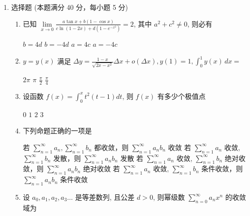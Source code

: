 
\begin{enumerate}
	\item
	选择题 (本题满分 40 分，每小题 5 分)
	
\begin{enumerate}
\item
已知 $\lim\limits _{x \rightarrow 0} \frac{a \tan x+b(1-\cos x)}{c \ln (1-2 x)+d\left(1-e^{-x^{2}}\right)}=2$, 其中 $a^{2}+c^{2}\neq 0$, 则必有 

	
\fourchoices
{$b=4 d$}
{$b=-4 d$}
{$a=4 c$}
{$a=-4 c$}

\item 
$y=y(x)$ 满足 $\Delta y=\frac{1-x}{\sqrt{2 x-x^{2}}} \Delta x+o(\Delta x), y(1)=1, \int_{0}^{1} y(x)\,dx=$  


\fourchoices
{$2 \pi$}
{$\pi$}
{$\frac{\pi}{2}$}
{$\frac{\pi}{4}$}

\item 
设函数 $f(x)=\int_{0}^{x} t^{2}(t-1) d t$, 则 $f(x)$ 有多少个极值点  


\fourchoices
{$ 0 $}
{$ 1 $}
{$ 2 $}
{$ 3 $}


\item 
下列命题正确的一项是  


\fourchoices
{若 $\sum\limits_{n=1}^{\infty} a_{n}, \sum\limits_{n=1}^{\infty} b_{n}$ 都收敛，则 $\sum\limits_{n=1}^{\infty} a_{n} b_{n}$ 收敛}
{若 $\sum\limits_{n=1}^{\infty} a_{n}$ 收敛, $\sum\limits_{n=1}^{\infty} b_{n}$ 发散，则 $\sum\limits_{n=1}^{\infty} a_{n} b_{n}$ 发散}
{若 $\sum\limits_{n=1}^{\infty} a_{n}$ 收敛, $\sum\limits_{n=1}^{\infty} b_{n}$ 绝对收敛，则 $\sum\limits_{n=1}^{\infty} a_{n} b_{n}$ 绝对收敛}
{若 $\sum\limits_{n=1}^{\infty} a_{n}$ 收敛, $\sum\limits_{n=1}^{\infty} b_{n}$ 条件收敛，则 $\sum\limits_{n=1}^{\infty} a_{n} b_{n}$ 条件收敛}


\item
设 $a_{0}, a_{1}, a_{2},a_{3} \ldots$ 是等差数列, 且公差 $d>0$, 则幂级数 $\sum\limits_{n=0}^{\infty} a_{n} x^{n}$ 的收敛域为 


\end{enumerate}
\end{enumerate}
